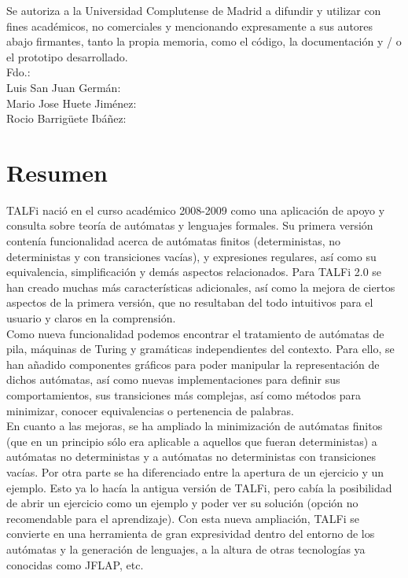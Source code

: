 \documentclass[12pt,a4paper,spanish]{book}
\begin{document}
Se autoriza a la Universidad Complutense de Madrid a difundir y utilizar con fines acad\'emicos, no comerciales y mencionando expresamente a sus autores abajo firmantes, tanto la propia memoria, como el c\'odigo, la documentaci\'on y / o el prototipo desarrollado.\\
\newline
\newline
Fdo.:\\
\newline
Luis San Juan Germ\'an:\\
\newline
\newline
\newline
\newline
Mario Jose Huete Jim\'enez:\\
\newline
\newline
\newline
\newline
Rocio Barrig\"{u}ete Ib\'a\~nez:\\
\tableofcontents


\chapter{Resumen}
TALFi naci\'o en el curso acad\'emico 2008-2009 como una aplicaci\'on de apoyo y consulta sobre teor\'ia de aut\'omatas y lenguajes formales.
Su primera versi\'on conten\'ia funcionalidad acerca de aut\'omatas finitos (deterministas, no deterministas y con transiciones vac\'ias), y expresiones regulares, as\'i como su equivalencia, simplificaci\'on y dem\'as aspectos relacionados.
Para TALFi 2.0 se han creado muchas m\'as caracter\'isticas adicionales, as\'i como la mejora de ciertos aspectos de la primera versi\'on, que no resultaban del todo intuitivos para el usuario y claros en la comprensi\'on.\\
Como nueva funcionalidad podemos encontrar el tratamiento de aut\'omatas de pila, m\'aquinas de Turing y gram\'aticas independientes del contexto. Para ello, se han a\~nadido componentes gr\'aficos para poder manipular la representaci\'on de dichos aut\'omatas, as\'i como nuevas implementaciones para definir sus comportamientos, sus transiciones m\'as complejas, as\'i como m\'etodos para minimizar, conocer equivalencias o pertenencia de palabras.\\
En cuanto a las mejoras, se ha ampliado la minimizaci\'on de aut\'omatas finitos (que en un principio s\'olo era aplicable a aquellos que fueran deterministas) a aut\'omatas no deterministas y a aut\'omatas no deterministas con transiciones vac\'ias. Por otra parte se ha diferenciado entre la apertura de un ejercicio y un ejemplo. Esto ya lo hac\'ia la antigua versi\'on de TALFi, pero cab\'ia la posibilidad de abrir un ejercicio como un ejemplo y poder ver su soluci\'on (opci\'on no recomendable para el aprendizaje).
Con esta nueva ampliaci\'on, TALFi se convierte en una herramienta de gran expresividad dentro del entorno de los aut\'omatas y la generaci\'on de lenguajes, a la altura de otras tecnolog\'ias ya conocidas como JFLAP, etc. 
\end{document}

